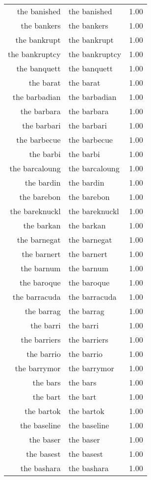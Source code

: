 \begin{table}[ht]
\begin{tabular}{rlr}
  the banished & the banished & 1.00 \\ 
  the bankers & the bankers & 1.00 \\ 
  the bankrupt & the bankrupt & 1.00 \\ 
  the bankruptcy & the bankruptcy & 1.00 \\ 
  the banquett & the banquett & 1.00 \\ 
  the barat & the barat & 1.00 \\ 
  the barbadian & the barbadian & 1.00 \\ 
  the barbara & the barbara & 1.00 \\ 
  the barbari & the barbari & 1.00 \\ 
  the barbecue & the barbecue & 1.00 \\ 
  the barbi & the barbi & 1.00 \\ 
  the barcaloung & the barcaloung & 1.00 \\ 
  the bardin & the bardin & 1.00 \\ 
  the barebon & the barebon & 1.00 \\ 
  the bareknuckl & the bareknuckl & 1.00 \\ 
  the barkan & the barkan & 1.00 \\ 
  the barnegat & the barnegat & 1.00 \\ 
  the barnert & the barnert & 1.00 \\ 
  the barnum & the barnum & 1.00 \\ 
  the baroque & the baroque & 1.00 \\ 
  the barracuda & the barracuda & 1.00 \\ 
  the barrag & the barrag & 1.00 \\ 
  the barri & the barri & 1.00 \\ 
  the barriers & the barriers & 1.00 \\ 
  the barrio & the barrio & 1.00 \\ 
  the barrymor & the barrymor & 1.00 \\ 
  the bars & the bars & 1.00 \\ 
  the bart & the bart & 1.00 \\ 
  the bartok & the bartok & 1.00 \\ 
  the baseline & the baseline & 1.00 \\ 
  the baser & the baser & 1.00 \\ 
  the basest & the basest & 1.00 \\ 
  the bashara & the bashara & 1.00 \\ 

\end{tabular}
\end{table}
